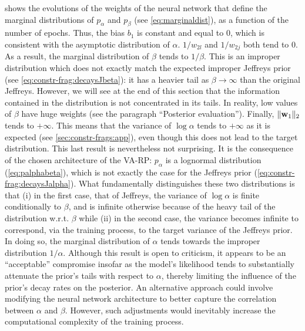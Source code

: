  shows the evolutions of the weights of the neural network that define the marginal distributions of $p_\alpha$ and $p_\beta$ (see \cref{eq:marginaldist}), as a function of the number of epochs. Thus, the bias $b_1$ is constant and equal to $0$, which is consistent with the asymptotic distribution of $\alpha$. $1/w_{2l}$ and $1/w_{2j}$ both tend to $0$. As a result, the marginal distribution of $\beta$ tends to $1/\beta$. This is an improper distribution which does not exactly match the expected improper Jeffreys prior (see \cref{eq:constr-frag:decaysJbeta}): it has a heavier tail as $\beta\to\infty$ than the original Jeffreys. 
However, we will see at the end of this section that the information contained in the distribution is not concentrated in its tails. In reality, low values of $\beta$ have huge weights
(see the paragraph ``Posterior evaluation''). Finally, $\|\mathbf{w}_1\|_2$ tends to $+\infty$. This means that the variance of  $\log\alpha$ tends to $+\infty$ as it is expected (see \cref{sec:constr-frags:app}), even though this does not lead to the target distribution. This last result is nevertheless not surprising. It is the consequence of the chosen architecture of the VA-RP: $p_\alpha$ is a lognormal distribution (\cref{eq:palphabeta}), which is not exactly the case for the Jeffreys prior (\cref{eq:constr-frag:decaysJalpha}). What fundamentally distinguishes these two distributions is that (i) in the first case, that of Jeffreys, the variance of $\log\alpha$ is finite conditionally to $\beta$, and is infinite otherwise because of the heavy tail of the distribution w.r.t. $\beta$ %
while (ii) in the second case, the variance becomes infinite to correspond, via the training process, to the target variance of the Jeffreys prior. In doing so, the marginal distribution of $\alpha$ tends towards the improper distribution $1/\alpha$. Although this result is open to criticism, it appears to be an ``acceptable'' compromise insofar as the model's likelihood tends to substantially attenuate the prior's tails with respect to $\alpha$, thereby limiting the influence of the prior's decay rates on the posterior. An alternative approach could involve modifying the neural network architecture to better capture the correlation between $\alpha$ and $\beta$. However, such adjustments would inevitably increase the computational complexity of the training process.


